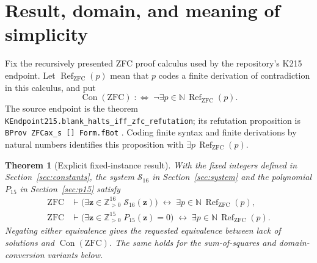 \documentclass[11pt,a4paper]{article}
\newtheorem{theorem}{Theorem}[section]
\theoremstyle{remark}
\newcommand{\N}{\mathbb N}
\newcommand{\Zp}{\mathbb Z_{>0}}
\newcommand{\Con}{\operatorname{Con}}
\newcommand{\ZFC}{\mathrm{ZFC}}
\newcommand{\ZRef}{\operatorname{Ref}_{\ZFC}}
\newcommand{\code}[1]{\nolinkurl{#1}}
\begin{document}
\begin{abstract}
We specialize the ProveIt fixed-program Diophantine compiler to the exact
215-state K215 machine calibrated to ZFC refutation. Since only one input
is needed, the universal construction's input Pell block can be replaced
by equality to a fixed marker. We prove that the three deleted input
witnesses can be restored as positive integers after main-rank recovery;
the proof uses neither a decoded computation nor the power-recovery
lemma. Combining this reduction with the repository's ordinary auxiliary
projection gives seven equations in sixteen positive unknowns. Combining
it with the normalized strong-root elimination gives one polynomial in
fifteen positive unknowns. We specify an actual coefficient slice by a
finite machine-to-window compiler, supply exact evaluation circuits,
prove uniform degree bounds, and give unrestricted-integer and quartic
variants. The distinction between a mathematical proof in ZFC, an
external proof-assistant theorem, and a new end-to-end formalization is
kept explicit throughout.
\end{abstract}

\tableofcontents
\newpage

\section{Result, domain, and meaning of simplicity}
\label{sec:result}

Fix the recursively presented ZFC proof calculus used by the repository's
K215 endpoint. Let $\ZRef(p)$ mean that $p$ codes a finite derivation of
contradiction in this calculus, and put
\[
\Con(\ZFC)\;:\!\iff\;\neg\exists p\in\N\,\ZRef(p).
\]
The source endpoint is the theorem
\code{KEndpoint215.blank_halts_iff_zfc_refutation}; its refutation
proposition is \code{BProv ZFCax_s [] Form.fBot} \cite{repo,k215}.
Coding finite syntax and finite derivations by natural numbers identifies
this proposition with $\exists p\,\ZRef(p)$.

\begin{theorem}[Explicit fixed-instance result]
\label{thm:main}
With the fixed integers defined in Section~\ref{sec:constants}, the system
$\mathcal S_{16}$ in Section~\ref{sec:system} and the polynomial $P_{15}$
in Section~\ref{sec:p15} satisfy
\begin{align*}
\ZFC&\vdash
 \bigl(\exists \mathbf z\in\Zp^{16}\;\mathcal S_{16}(\mathbf z)\bigr)
 \;\longleftrightarrow\;\exists p\in\N\,\ZRef(p),\\
\ZFC&\vdash
 \bigl(\exists \mathbf z\in\Zp^{15}\;P_{15}(\mathbf z)=0\bigr)
 \;\longleftrightarrow\;\exists p\in\N\,\ZRef(p).
\end{align*}
Negating either equivalence gives the requested equivalence between lack
of solutions and $\Con(\ZFC)$. The same holds for the sum-of-squares and
domain-conversion variants below.
\end{theorem}
\end{document}
